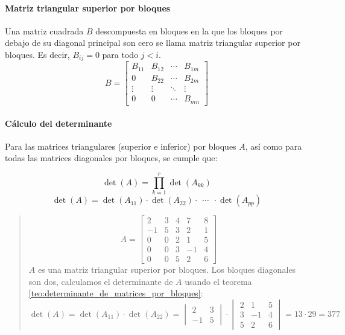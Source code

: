 \paragraph{Matriz triangular superior por bloques}

Una matriz cuadrada \(B\) descompuesta en bloques en la que los bloques por debajo de su diagonal principal son cero se llama matriz triangular superior por bloques. Es decir, \(B_{ij} = 0\) para todo \(j < i\).
\[
B = \begin{bmatrix}
  B_{11} & B_{12} & \cdots & B_{1m} \\
  0 & B_{22} & \cdots & B_{2m} \\
  \vdots & \vdots & \ddots & \vdots \\
  0 & 0 & \cdots & B_{mn}
\end{bmatrix}
\]

\paragraph{Cálculo del determinante}

Para las matrices triangulares (superior e inferior) por bloques \(A\), así como para todas las matrices diagonales por bloques, se cumple que:

\[
  \det(A) = \prod_{k=1}^{r}\det(A_{kk})
\]
\label{teo:determinante_de_matrices_por_bloques}
\[
\det(A) = \det(A_{11}) \cdot \det(A_{22}) \cdot ~~ \cdots ~~ \cdot \det(A_{pp})
\]
\begin{quote}  
  \[
  A = \left[\begin{array}{cc|ccc}
    2 & 3 & 4 & 7 & 8 \\
    -1 & 5 & 3 & 2 & 1 \\
    \hline
    0 & 0 & 2 & 1 & 5 \\
    0 & 0 & 3 & -1 & 4 \\
    0 & 0 & 5 & 2 & 6 
  \end{array}\right]
  \]
  \(A\) es una matriz triangular superior por bloques. Los bloques diagonales son dos, calculamos el determinante de \(A\) usando el teorema \ref{teo:determinante_de_matrices_por_bloques}:
  \[
  \det(A) = \det(A_{11}) \cdot \det(A_{22}) = \begin{vmatrix}
    2 & 3 \\ 
    -1 & 5
  \end{vmatrix} \cdot \begin{vmatrix}
    2 & 1 & 5 \\
    3 & -1 & 4 \\
    5 & 2 & 6
  \end{vmatrix} = 13 \cdot 29 = 377
  \]
\end{quote}

